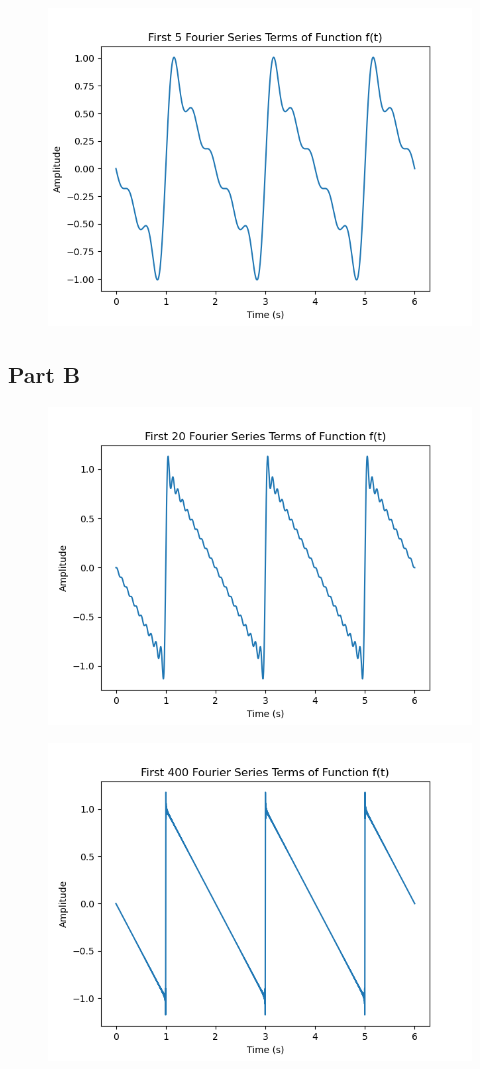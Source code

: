 \documentclass[]{report}
\begin{document}
\begin{figure}[H]
	\centering
	\includegraphics[width=0.7\linewidth]{../results/p2_5}
\end{figure}


\subsection{Part B}


\begin{figure}[H]
	\centering
	\includegraphics[width=0.7\linewidth]{../results/p2_20}
\end{figure}

\begin{figure}[H]
	\centering
	\includegraphics[width=0.7\linewidth]{../results/p2_400}
\end{figure}
\end{document}
